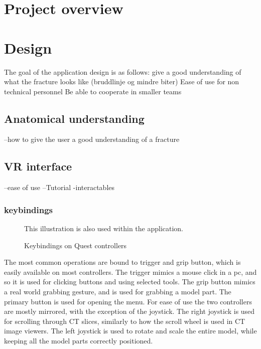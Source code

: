 \documentclass[a4paper]{report}
\begin{document}
\section{Project overview}\label{CodeStructure}

\section{Design}

The goal of the application design is as follows:
give a good understanding of what the fracture looks like (bruddlinje og mindre biter)
Ease of use for non technical personnel
Be able to cooperate in smaller teams

\subsection{Anatomical understanding}
--how to give the user a good understanding of a fracture

\subsection{VR interface}
--ease of use
--Tutorial
-interactables

\subsubsection{keybindings}
\begin{figure}[h!]
    \centering
	\hfill
  \caption{Keybindings on Quest controllers}
  \small
  This illustration is also used within the application. 
\end{figure}

The most common operations are bound to trigger and grip button, which is easily available on most controllers. The trigger mimics a mouse click in a pc, and so it is used for clicking buttons and using selected tools. The grip button mimics a real world grabbing gesture, and is used for grabbing a model part.
The primary button is used for opening the menu.
For ease of use the two controllers are mostly mirrored, with the exception of the joystick. The right joystick is used for scrolling through CT slices, similarly to how the scroll wheel is used in CT image viewers. The left joystick is used to rotate and scale the entire model, while keeping all the model parts correctly positioned.
\end{document}
